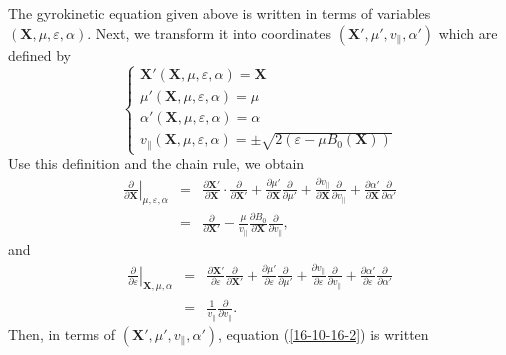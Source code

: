 \documentclass{llncs}
\begin{document}
The gyrokinetic equation given above is written in terms of variables
$(\mathbf{X}, \mu, \varepsilon, \alpha)$. Next, we transform it into
coordinates $(\mathbf{X}', \mu', v_{\parallel}, \alpha')$ which are defined by
\begin{equation}
  \left\{ \begin{array}{l}
    \mathbf{X}' (\mathbf{X}, \mu, \varepsilon, \alpha) =\mathbf{X}\\
    \mu' (\mathbf{X}, \mu, \varepsilon, \alpha) = \mu\\
    \alpha' (\mathbf{X}, \mu, \varepsilon, \alpha) = \alpha\\
    v_{\parallel} (\mathbf{X}, \mu, \varepsilon, \alpha) = \pm \sqrt{2
    (\varepsilon - \mu B_0 (\mathbf{X}))}
  \end{array} \right.
\end{equation}
Use this definition and the chain rule, we obtain
\begin{eqnarray}
  \left. \frac{\partial}{\partial \mathbf{X}} \right|_{\mu, \varepsilon,
  \alpha} & = & \frac{\partial \mathbf{X}'}{\partial \mathbf{X}} \cdot
  \frac{\partial}{\partial \mathbf{X}'} + \frac{\partial \mu'}{\partial
  \mathbf{X}}  \frac{\partial}{\partial \mu'} + \frac{\partial
  v_{\parallel}}{\partial \mathbf{X}}  \frac{\partial}{\partial v_{\parallel}}
  + \frac{\partial \alpha' }{\partial \mathbf{X}}  \frac{\partial}{\partial
  \alpha'} \nonumber\\
  & = & \frac{\partial}{\partial \mathbf{X}'} - \frac{\mu}{v_{\parallel}} 
  \frac{\partial B_0}{\partial \mathbf{X}}  \frac{\partial}{\partial
  v_{\parallel}},  \label{19-1-2-e1}
\end{eqnarray}
and
\begin{eqnarray}
  \left. \frac{\partial}{\partial \varepsilon} \right|_{\mathbf{X}, \mu,
  \alpha} & = & \frac{\partial \mathbf{X}'}{\partial \varepsilon}
  \frac{\partial}{\partial \mathbf{X}'} + \frac{\partial \mu'}{\partial
  \varepsilon} \frac{\partial}{\partial \mu'} + \frac{\partial
  v_{\parallel}}{\partial \varepsilon} \frac{\partial}{\partial v_{\parallel}}
  + \frac{\partial \alpha'}{\partial \varepsilon} \frac{\partial}{\partial
  \alpha'} \nonumber\\
  & = &  \frac{1}{v_{\parallel}}  \frac{\partial}{\partial v_{\parallel}} . 
\end{eqnarray}
Then, in terms of $(\mathbf{X}', \mu', v_{\parallel}, \alpha')$, equation
(\ref{16-10-16-2}) is written
\end{document}
